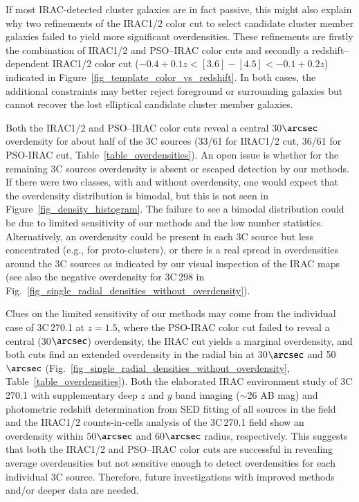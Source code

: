 \documentclass[mathleft,fleqn,%
]{an}
\begin{document}
If %
most IRAC-detected cluster galaxies are in fact passive, 
this might also explain why two
refinements of the IRAC1/2 color cut to select candidate 
cluster member galaxies failed to
yield more significant overdensities. These refinements are firstly
the combination of IRAC1/2 and PSO--IRAC color cuts and secondly
a redshift--dependent IRAC1/2 color cut
($-0.4+0.1z < [3.6] - [4.5] < -0.1+0.2z $) 
indicated %
in Figure~\ref{fig_template_color_vs_redshift}. 
In both cases, the additional constraints may better reject foreground
or surrounding galaxies but cannot recover the lost  
elliptical candidate cluster member galaxies.

Both the IRAC1/2 and PSO--IRAC color
cuts reveal a central 30$\arcsec$ overdensity for about half of the 3C sources
(33/61 for IRAC1/2 cut, 36/61 for PSO-IRAC cut, Table~\ref{table_overdensities}).  
An open issue is
whether for the remaining 3C sources  %
overdensity is absent or escaped detection by our methods. 
If there were two classes, with and without overdensity,
one would expect that the overdensity
distribution is bimodal, but this is not seen in
Figure~\ref{fig_density_histogram}. 
The failure to see a bimodal distribution could be due to limited 
sensitivity of our methods and the low number
statistics.
Alternatively, an overdensity could be present in each 3C source but less concentrated (e.g., for  
proto-clusters), or there is a real spread in overdensities around the
3C sources as indicated by our visual inspection of the IRAC maps
(see also the negative overdensity for 3C\,298 in
Fig.~\ref{fig_single_radial_densities_without_overdensity}).

Clues on the limited sensitivity of our methods may come from  
the individual case of  3C\,270.1 at $z=1.5$, where the PSO-IRAC color
cut failed
to reveal a central (30$\arcsec$) overdensity,
the IRAC cut yields a marginal overdensity, and both cuts find an extended overdensity in the radial
bin at 30$\arcsec$ and 50$\arcsec$
(Fig.~\ref{fig_single_radial_densities_without_overdensity}, 
Table~\ref{table_overdensities}).
Both the elaborated IRAC environment study of 3C\,270.1
with supplementary deep $z$ and $y$ band imaging ($\sim$26 AB mag) and
photometric redshift determination from SED fitting of all sources in
the field 
\citep{Haas09} and the IRAC1/2 counts-in-cells analysis of the 3C\,270.1
field 
\citep{Galametz12} show an overdensity
within 50$\arcsec$ and 60$\arcsec$  radius, respectively. 
This suggests that both the IRAC1/2 and PSO--IRAC color
cuts are successful in revealing average overdensities but not
sensitive enough to detect overdensities for each individual 3C
source.  
Therefore, future investigations with improved methods and/or 
deeper data are needed. 
\end{document}
